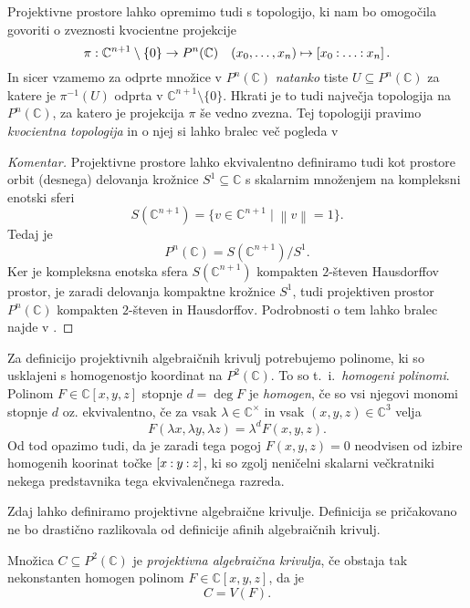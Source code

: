 \documentclass[mat1]{fmfdelo}
\numberwithin{equation}{section}
\newcommand{\C}{\mathbb C}
\newcommand{\CM}{\mathbb C ^\times}
\newcommand{\PC}{P^2(\mathbb C)}
\newcommand{\inv}{^{-1}}
\newcommand{\pcoor}[1]{%
\begingroup\lccode`~=`: \lowercase{\endgroup
\edef~}{\mathbin{\mathchar\the\mathcode`:}\nobreak}%
\left[%
\begingroup
\mathcode`:=\string"8000
#1%
\endgroup
\right]%
}
\theoremstyle{definition}
\newenvironment{komentar}[1][Komentar]{\begin{proof}[#1]\let\qed\relax}{\end{proof}}
\begin{document}
\begin{opomba} 
    \label{topologija na projektivnih prostorih}   
    Projektivne prostore lahko opremimo tudi s topologijo, ki nam bo omogočila govoriti o zveznosti kvocientne projekcije
    \[
        \pi : \C^{n+1}\setminus\{0\} \to P^n(\C) \quad (x_0, \ldots, x_n) \mapsto \pcoor{x_0 : \ldots : x_n}. 
    \]
    In sicer vzamemo za odprte množice v $P^n(\C)$ \emph{natanko} tiste $U \subseteq P^n(\C)$ za katere je $\pi\inv(U)$ odprta v $\C^{n+1}\setminus\{0\}$. Hkrati je to tudi največja topologija na $P^n(\C)$, za katero je projekcija $\pi$ še vedno zvezna.  
    Tej topologiji pravimo \emph{kvocientna topologija} in o njej si lahko bralec več pogleda v \cite[poglavje 3.2.]{MrcunTop}
\end{opomba}

\begin{komentar}
    Projektivne prostore lahko ekvivalentno definiramo tudi kot prostore orbit (desnega) delovanja krožnice $S^1 \subseteq \C$ s skalarnim množenjem na kompleksni enotski sferi 
    \[
        S(\C^{n+1}) = \{v \in \C^{n+1} \mid \left\lVert v\right\rVert = 1\}.
    \]
    Tedaj je
    \[
        P^n(\C) = S(\C^{n+1})/S^1.
    \]
    Ker je kompleksna enotska sfera $S(\C^{n+1})$ kompakten $2$-števen Hausdorffov prostor, je zaradi delovanja kompaktne krožnice $S^1$, tudi projektiven prostor $P^n(\C)$ kompakten $2$-števen in Hausdorffov. Podrobnosti o tem lahko bralec najde v 
    \cite[Zgled 3.43. (2)]{MrcunTop}.
\end{komentar}

Za definicijo projektivnih algebraičnih krivulj potrebujemo  polinome, ki so usklajeni s homogenostjo koordinat na $\PC$. To so t.~i.\ \emph{homogeni polinomi}. Polinom $F \in \C[x,y,z]$ stopnje $d = \deg F$ je \emph{homogen}, če so vsi njegovi monomi stopnje $d$ oz. ekvivalentno, če za vsak $\lambda \in \CM$ in vsak $(x,y,z) \in \C^3$ velja
\[
    F(\lambda x, \lambda y, \lambda z) = \lambda^d F(x,y,z). 
\]
Od tod opazimo tudi, da je zaradi tega pogoj $F(x,y,z) = 0$ neodvisen od izbire homogenih koorinat točke $\pcoor{x : y : z}$, ki so zgolj neničelni skalarni večkratniki nekega predstavnika tega ekvivalenčnega razreda.  

Zdaj lahko definiramo projektivne algebraične krivulje. Definicija se pričakovano ne bo drastično razlikovala od definicije afinih algebraičnih krivulj.

\begin{definicija}
    Množica $C \subseteq \PC$ je \emph{projektivna algebraična krivulja}, če obstaja tak nekonstanten homogen polinom $F \in \C[x,y,z]$, da je
    \[
        C = V(F). 
    \]
\end{definicija}
\end{document}
